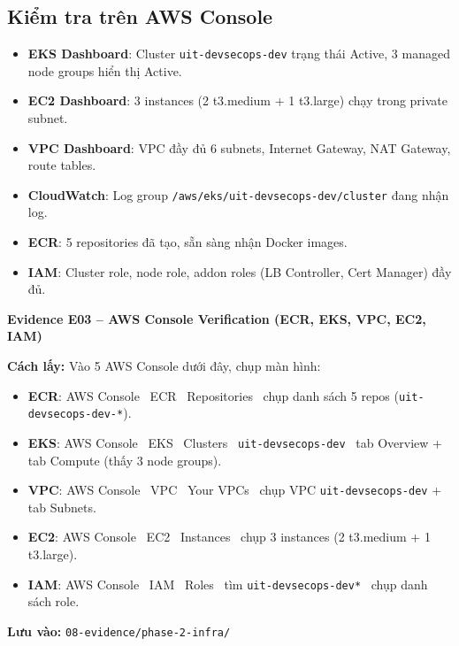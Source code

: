 \documentclass[13pt,a4paper,twoside]{extarticle}
\newcommand{\evidence}[1]{%
  \begin{evidencebox}
  #1
  \end{evidencebox}
}
\begin{document}
\subsection{Kiểm tra trên AWS Console}

\begin{itemize}[leftmargin=*,nosep]
  \item \textbf{EKS Dashboard}: Cluster \texttt{uit-devsecops-dev} trạng thái Active, 3 managed node groups hiển thị Active.
  \item \textbf{EC2 Dashboard}: 3 instances (2 t3.medium + 1 t3.large) chạy trong private subnet.
  \item \textbf{VPC Dashboard}: VPC đầy đủ 6 subnets, Internet Gateway, NAT Gateway, route tables.
  \item \textbf{CloudWatch}: Log group \texttt{/aws/eks/uit-devsecops-dev/cluster} đang nhận log.
  \item \textbf{ECR}: 5 repositories đã tạo, sẵn sàng nhận Docker images.
  \item \textbf{IAM}: Cluster role, node role, addon roles (LB Controller, Cert Manager) đầy đủ.
\end{itemize}

\evidence{
\textbf{Evidence E03 -- AWS Console Verification (ECR, EKS, VPC, EC2, IAM)}

\smallskip
\textbf{Cách lấy:} Vào 5 AWS Console dưới đây, chụp màn hình:
\begin{itemize}[leftmargin=*,nosep]
  \item \textbf{ECR}: AWS Console \textrightarrow\ ECR \textrightarrow\ Repositories \textrightarrow\ chụp danh sách 5 repos (\texttt{uit-devsecops-dev-*}).
  \item \textbf{EKS}: AWS Console \textrightarrow\ EKS \textrightarrow\ Clusters \textrightarrow\ \texttt{uit-devsecops-dev} \textrightarrow\ tab Overview + tab Compute (thấy 3 node groups).
  \item \textbf{VPC}: AWS Console \textrightarrow\ VPC \textrightarrow\ Your VPCs \textrightarrow\ chụp VPC \texttt{uit-devsecops-dev} + tab Subnets.
  \item \textbf{EC2}: AWS Console \textrightarrow\ EC2 \textrightarrow\ Instances \textrightarrow\ chụp 3 instances (2 t3.medium + 1 t3.large).
  \item \textbf{IAM}: AWS Console \textrightarrow\ IAM \textrightarrow\ Roles \textrightarrow\ tìm \texttt{uit-devsecops-dev*} \textrightarrow\ chụp danh sách role.
\end{itemize}
\textbf{Lưu vào:} \texttt{08-evidence/phase-2-infra/}
}
\end{document}
